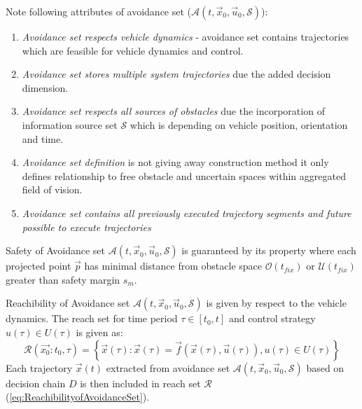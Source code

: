     \begin{note} Note following attributes of avoidance set ($\mathscr{A}(t,\vec{x}_0,\vec{u}_0,\mathscr{S})$):
    \begin{enumerate}
        \item \emph{Avoidance set respects vehicle dynamics} - avoidance set contains trajectories which are feasible for vehicle dynamics and control.
        \item \emph{Avoidance set stores multiple system trajectories} due the added decision dimension.
        \item \emph{Avoidance set respects all sources of obstacles} due the incorporation of information source set $\mathscr{S}$ which is depending on vehicle position, orientation and time.
        \item \emph{Avoidance set definition} is not giving away construction method it only defines relationship to free obstacle and uncertain spaces within aggregated field of vision.
        \item \emph{Avoidance set contains all previously executed trajectory segments and future possible to execute trajectories}
    \end{enumerate}
    \end{note}
    
    \begin{definition}{Safety of Avoidance set $\mathscr{A}(t,\vec{x}_0,\vec{u}_0,\mathscr{S})$} is guaranteed by its property where each projected point $\vec{p}$ has minimal distance from obstacle space $\mathscr{O}(t_{fix})$ or $\mathscr{U}(t_{fix})$ greater than safety margin $s_m$.
    \end{definition}
    
    \begin{definition}{Reachibility of Avoidance set $\mathscr{A}(t,\vec{x}_0,\vec{u}_0,\mathscr{S})$} is given by respect to the vehicle dynamics. The reach set for time period $\tau\in[t_0,t]$ and control strategy $u(\tau)\in U(\tau)$ is given as:
    \begin{equation}\label{eq:ReachibilityofAvoidanceSet}
        \mathscr{R}(\vec{x_0}:t_0,\tau)=\left\{\vec{x}(\tau):\vec{x}(\tau)=\vec{f}(\vec{x}(\tau),\vec{u}(\tau)),u(\tau)\in U(\tau)\right\}
    \end{equation}
    Each trajectory $\vec{x}(t)$ extracted from avoidance set $\mathscr{A}(t,\vec{x}_0,\vec{u}_0,\mathscr{S})$ based on decision chain $D$ is then included in reach set $\mathscr{R}$ (\ref{eq:ReachibilityofAvoidanceSet}).
    \end{definition}
    

